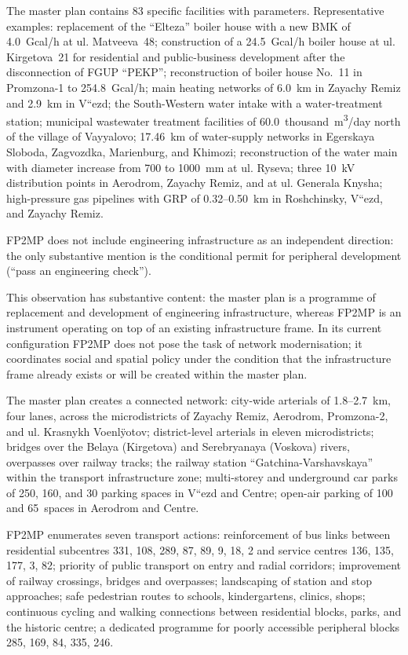 The master plan contains 83 specific facilities with parameters. Representative examples: replacement of the ``Elteza'' boiler house with a new BMK of 4.0~Gcal/h at ul. Matveeva~48; construction of a 24.5~Gcal/h boiler house at ul. Kirgetova~21 for residential and public-business development after the disconnection of FGUP ``PEKP''; reconstruction of boiler house No.~11 in Promzona-1 to 254.8~Gcal/h; main heating networks of 6.0~km in Zayachy Remiz and 2.9~km in V``ezd; the South-Western water intake with a water-treatment station; municipal wastewater treatment facilities of 60.0~thousand~m\textsuperscript{3}/day north of the village of Vayyalovo; 17.46~km of water-supply networks in Egerskaya Sloboda, Zagvozdka, Marienburg, and Khimozi; reconstruction of the water main with diameter increase from 700 to 1000~mm at ul. Ryseva; three 10~kV distribution points in Aerodrom, Zayachy Remiz, and at ul. Generala Knysha; high-pressure gas pipelines with GRP of 0.32--0.50~km in Roshchinsky, V``ezd, and Zayachy Remiz.
 
FP2MP does not include engineering infrastructure as an independent direction: the only substantive mention is the conditional permit for peripheral development (``pass an engineering check'').
 
This observation has substantive content: the master plan is a programme of replacement and development of engineering infrastructure, whereas FP2MP is an instrument operating on top of an existing infrastructure frame. In its current configuration FP2MP does not pose the task of network modernisation; it coordinates social and spatial policy under the condition that the infrastructure frame already exists or will be created within the master plan.
 
The master plan creates a connected network: city-wide arterials of 1.8--2.7~km, four lanes, across the microdistricts of Zayachy Remiz, Aerodrom, Promzona-2, and ul. Krasnykh Voenl\"yotov; district-level arterials in eleven microdistricts; bridges over the Belaya (Kirgetova) and Serebryanaya (Voskova) rivers, overpasses over railway tracks; the railway station ``Gatchina-Varshavskaya'' within the transport infrastructure zone; multi-storey and underground car parks of 250, 160, and 30 parking spaces in V``ezd and Centre; open-air parking of 100 and 65~spaces in Aerodrom and Centre.
 
FP2MP enumerates seven transport actions: reinforcement of bus links between residential subcentres 331, 108, 289, 87, 89, 9, 18, 2 and service centres 136, 135, 177, 3, 82; priority of public transport on entry and radial corridors; improvement of railway crossings, bridges and overpasses; landscaping of station and stop approaches; safe pedestrian routes to schools, kindergartens, clinics, shops; continuous cycling and walking connections between residential blocks, parks, and the historic centre; a dedicated programme for poorly accessible peripheral blocks 285, 169, 84, 335, 246.
 
